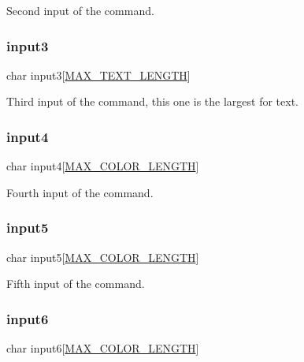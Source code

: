 Second input of the command. \mbox{\label{struct_l_l_1_1command__t_a0d3262af18e36d5f86a8871515a3403a}} 
\subsubsection{\texorpdfstring{input3}{input3}}
{\footnotesize\ttfamily char input3\mbox{[}\mbox{\hyperlink{group___global_ga9a90baeac9b3273d185357200b599b39}{M\+A\+X\+\_\+\+T\+E\+X\+T\+\_\+\+L\+E\+N\+G\+TH}}\mbox{]}}

Third input of the command, this one is the largest for text. \mbox{\label{struct_l_l_1_1command__t_aa775e1d41b69141ea7d7072cf80128ff}} 
\subsubsection{\texorpdfstring{input4}{input4}}
{\footnotesize\ttfamily char input4\mbox{[}\mbox{\hyperlink{group___global_ga9db5737c1a3aca5e334701167cae3e00}{M\+A\+X\+\_\+\+C\+O\+L\+O\+R\+\_\+\+L\+E\+N\+G\+TH}}\mbox{]}}

Fourth input of the command. \mbox{\label{struct_l_l_1_1command__t_a5392f8cc032dbb16f447d2dcbf85e753}} 
\subsubsection{\texorpdfstring{input5}{input5}}
{\footnotesize\ttfamily char input5\mbox{[}\mbox{\hyperlink{group___global_ga9db5737c1a3aca5e334701167cae3e00}{M\+A\+X\+\_\+\+C\+O\+L\+O\+R\+\_\+\+L\+E\+N\+G\+TH}}\mbox{]}}

Fifth input of the command. \mbox{\label{struct_l_l_1_1command__t_a18d015c30e58eb834dcd71ad77069384}} 
\subsubsection{\texorpdfstring{input6}{input6}}
{\footnotesize\ttfamily char input6\mbox{[}\mbox{\hyperlink{group___global_ga9db5737c1a3aca5e334701167cae3e00}{M\+A\+X\+\_\+\+C\+O\+L\+O\+R\+\_\+\+L\+E\+N\+G\+TH}}\mbox{]}}

